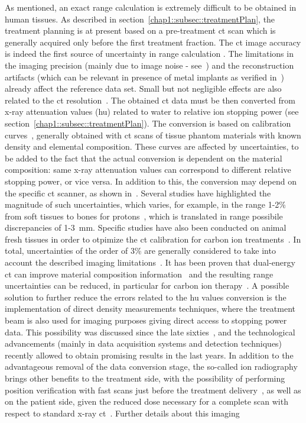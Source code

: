 As mentioned, an exact range calculation is extremely difficult to be obtained in human tissues. As described in section~\ref{chap1::subsec::treatmentPlan}, the treatment planning is at present based on a pre-treatment \gls{ct} scan which is generally acquired only before the first treatment fraction. The \gls{ct} image accuracy is indeed the first source of uncertainty in range calculation . The limitations in the imaging precision (mainly due to image noise - see~\cite{Chvetsov2010}) and the reconstruction artifacts (which can be relevant in presence of metal implants as verified in~\cite{Jakel2007, Newhauser2007}) already affect the reference data set. Small but not negligible effects are also related to the \gls{ct} resolution~\parencite{Espana2011}. The obtained \gls{ct} data must be then converted from x-ray attenuation values (\gls{hu}) related to water to relative ion stopping power (see section~\ref{chap1::subsec::treatmentPlan}). The conversion is based on calibration curves~\parencite{Schneider1996, Schneider2000}, generally obtained with \gls{ct} scans of tissue phantom materials with known density and elemental composition. These curves are affected by uncertainties, to be added to the fact that the actual conversion is dependent on the material composition: same x-ray attenuation values can correspond to different relative stopping power, or vice versa. In addition to this, the conversion may depend on the specific \gls{ct} scanner, as shown in~\cite{Ainsley2014}. Several studies have highlighted the magnitude of such uncertainties, which varies, for example, in the range 1-2\% from soft tissues to bones for protons~\parencite{Schaffner1998b}, which is translated in range possibile discrepancies of 1-3~mm. Specific studies have also been conducted on animal fresh tissues in order to otpimize the \gls{ct} calibration for carbon ion treatments~\parencite{Rietzel2007}. In total, uncertainties of the order of 3\% are generally considered to take into account the described imaging limitations~\parencite{Moyers2001}. It has been proven that dual-energy \gls{ct} can improve material composition information~\parencite{Bazalova2008, Yang2010, Hunemor2014, Wohlfahrt2018} and the resulting range uncertainties can be reduced, in particular for carbon ion therapy~\parencite{Hunemor2014}. A possible solution to further reduce the errors related to the \gls{hu} values conversion is the implementation of direct density measurements techniques, where the treatment beam is also used for imaging purposes giving direct access to stopping power data. This possibility was discussed since the late sixties~\parencite{Koehler1968}, and the technological advancements (mainly in data acquisition systems and detection techniques) recently allowed to obtain promising results in the last years. In addition to the advantageous removal of the data conversion stage, the so-called ion radiography brings other benefits to the treatment side, with the possibility of performing position verification with fast scans just before the treatment delivery~\parencite{Schneider1995}, as well as on the patient side, given the reduced dose necessary for a complete scan with respect to standard x-ray \gls{ct}~\parencite{Schneider1995}. Further details about this imaging 